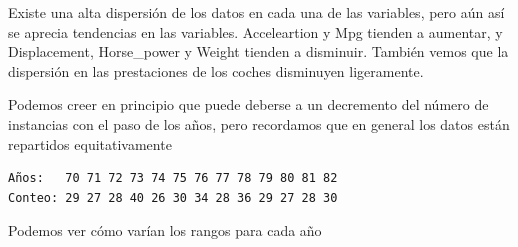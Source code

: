 Existe una alta dispersión de los datos en cada una de las variables, pero aún así se aprecia tendencias en las variables. Acceleartion y Mpg tienden a aumentar, y Displacement, Horse\_power y Weight tienden a disminuir. También vemos que la dispersión en las prestaciones de los coches disminuyen ligeramente.

Podemos creer en principio que puede deberse a un decremento del número de instancias con el paso de los años, pero recordamos que en general los datos están repartidos equitativamente

\begin{verbatim}
Años:   70 71 72 73 74 75 76 77 78 79 80 81 82 
Conteo: 29 27 28 40 26 30 34 28 36 29 27 28 30 
\end{verbatim}

Podemos ver cómo varían los rangos para cada año

